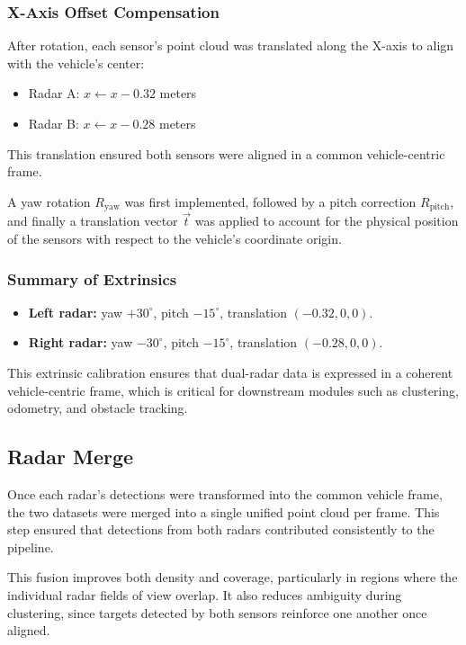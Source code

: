 \subsubsection{X-Axis Offset Compensation}
After rotation, each sensor's point cloud was translated along the X-axis to align with the vehicle's center:
\begin{itemize}
    \item Radar A: $x \leftarrow x - 0.32$ meters
    \item Radar B: $x \leftarrow x - 0.28$ meters
\end{itemize}

This translation ensured both sensors were aligned in a common vehicle-centric frame.

A yaw rotation \( R_{\text{yaw}} \) was first implemented, followed by a pitch correction \( R_{\text{pitch}} \), and finally a translation vector \( \vec{t} \) was applied to account for the physical position of the sensors with respect to the vehicle's coordinate origin.

\subsubsection{Summary of Extrinsics}
\begin{itemize}
    \item \textbf{Left radar:} yaw $+30^\circ$, pitch $-15^\circ$, translation $(-0.32, 0, 0)$.
    \item \textbf{Right radar:} yaw $-30^\circ$, pitch $-15^\circ$, translation $(-0.28, 0, 0)$.
\end{itemize}

This extrinsic calibration ensures that dual-radar data is expressed in a coherent vehicle-centric frame, which is critical for downstream modules such as clustering, odometry, and obstacle tracking.

\newpage
\subsection{Radar Merge}  
\indent Once each radar's detections were transformed into the common vehicle frame, the two datasets were merged into a single unified point cloud per frame.  
This step ensured that detections from both radars contributed consistently to the pipeline.  

This fusion improves both density and coverage, particularly in regions where the individual radar fields of view overlap.  
It also reduces ambiguity during clustering, since targets detected by both sensors reinforce one another once aligned.  

